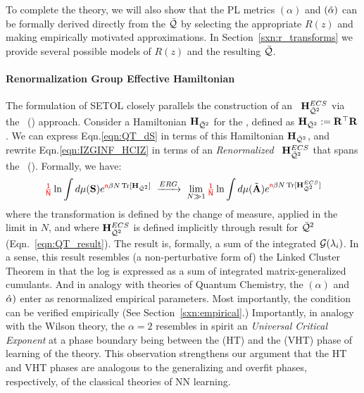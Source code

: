 To complete the theory, we
will also show that the \HTSR PL \LayerQuality metrics \ALPHA $(\alpha)$  and \ALPHAHAT $(\hat\alpha)$
can be formally derived directly from the \SETOL \LayerQuality $\bar{\mathcal{Q}}$ by selecting the appropriate
\RTransform $R(z)$ and making empirically motivated approximations. In Section~\ref{sxn:r_transforms} we provide several possible
models of $R(z)$ and the resulting \LayerQuality $\bar{\mathcal{Q}}$.

\paragraph{Renormalization Group Effective Hamiltonian}
The formulation of SETOL closely parallels the construction of an \EffectiveHamiltonian~$\mathbf{H}^{ECS}_{\bar{\mathcal{Q}}^{2}}$
via the \WilsonExactRenormalizationGroup~(\ERG) approach. Consider a \emph{\Bare} Hamiltonian $\mathbf{H}_{\bar{\mathcal{Q}}^{2}}$ for the \LayerQualitySquared,
defined as $\mathbf{H}_{\bar{\mathcal{Q}}^{2}}:= \mathbf{R}^{\top}\mathbf{R}$.
We can express Eqn.\ref{eqn:QT_dS} in terms of this \Bare Hamiltonian $\mathbf{H}_{\bar{\mathcal{Q}}^{2}}$,
and rewrite Eqn.\ref{eqn:IZGINF_HCIZ} in terms of an \emph{Renormalized} \EffectiveHamiltonian~$\mathbf{H}^{ECS}_{\bar{\mathcal{Q}}^{2}}$
that spans the \EffectiveCorrelationSpace~(\ECS). Formally, we have:
\begin{align}
\label{eqn:RG}
{\color{red}\sf{\tfrac{1}{N}}}\ln \int d\mu({\mathbf{S}})e^{{\color{red}\sf{n}} \beta N \operatorname{Tr}[\mathbf{H}_{\bar{\mathcal{Q}}^{2}}]} \;\xrightarrow{ERG}\; \lim_{N\gg 1}{\color{red}\sf{\tfrac{1}{N}}}\ln \int d\mu(\tilde{\mathbf{A}})e^{{\color{red}\sf{n}} \beta N \operatorname{Tr}[\mathbf{H}^{ECS}_{\bar{\mathcal{Q}}^{2}}]} 
\end{align}
where the \ERG transformation is defined by the \ScaleInvariant change of measure,
applied in the \WideLayer \LargeN limit in $N$,
and where $\mathbf{H}^{ECS}_{\bar{\mathcal{Q}}^{2}}$ is defined implicitly through result for $\bar{\mathcal{Q}}^{2}$ (Eqn.~\ref{eqn:QT_result}).
The result is, formally, a sum of the integrated \RTransforms $\mathcal{G}(\lambda_{i})$.
In a sense, this result resembles (a non-perturbative form of) the Linked Cluster Theorem
in that the log \PartitionFunction is expressed as a sum of integrated matrix-generalized cumulants.  And in analogy with \SemiEmpirical theories of Quantum Chemistry, the \HTSR \ALPHA $(\alpha)$ and \ALPHAHAT $\hat\alpha)$ enter as renormalized empirical parameters.
Most importantly, the \ScaleInvariant \TRACELOG condition can be verified empirically (See Section~\ref{sxn:empirical}.)
Importantly, in analogy with the Wilson \ExactRenormalizatonGroup theory, 
the \HTSR $\alpha=2$ resembles in spirit
an \ERG \emph{Universal Critical Exponent} at a phase boundary being between the \HeavyTailed 
(HT) and the \VeryHeavyTailed (VHT) phase of learning of the \HTSR theory.
This observation strengthens our argument that the \HTSR HT and VHT phases
are analogous to the generalizing and overfit phases, respectively,
of the classical \SMOG theories of NN learning.


